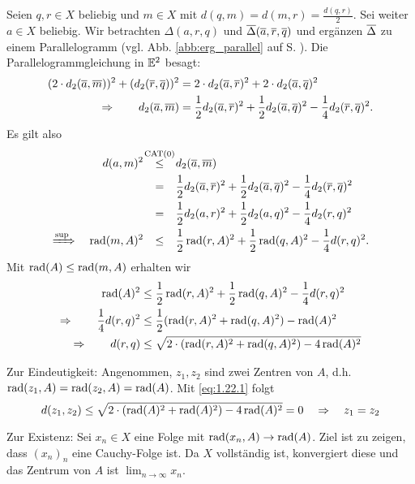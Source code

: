 \begin{beweis}
	Seien $q,r \in X$ beliebig und $m \in X$ mit $d(q,m) = d(m,r) = \frac{d(q,r)}{2}$.
	Sei weiter $a \in X$ beliebig. Wir betrachten $\Delta(a,r,q)$ und $\overline{\Delta}(\overline{a},\overline{r},\overline{q})$ und ergänzen $\overline{\Delta}$ zu einem Parallelogramm (vgl. Abb. \ref{abb:erg_parallel} auf S. \pageref{abb:erg_parallel}). Die Parallelogrammgleichung in $\mathbb{E}^2$ besagt:
	\begin{align*}
		(2 \cdot d_2(\overline{a},\overline{m}))^2 + (d_2(\overline{r},\overline{q}))^2 &= 2 \cdot d_2(\overline{a},\overline{r})^2 + 2 \cdot d_2 (\overline{a},\overline{q})^2 \\
		\Rightarrow \qquad d_2(\overline{a},\overline{m}) &= \frac{1}{2} d_2(\overline{a},\overline{r})^2 + \frac{1}{2} d_2(\overline{a},\overline{q})^2 - \frac{1}{4} d_2 (\overline{r},\overline{q})^2.
	\end{align*}
	\newpage
	Es gilt also
	\begin{align*}
		d(a,m)^2 &\stack{\CAT}{\leq} d_2(\ol{a},\ol{m}) \\
		&\stack{}{=} \frac{1}{2} d_2(\ol{a},\ol{r})^2 + \frac{1}{2} d_2(\ol{a},\ol{q})^2 - \frac{1}{4} d_2 (\ol{r},\ol{q})^2 \\
		&\stack{}{=} \frac{1}{2} d_2(a,r)^2 + \frac{1}{2} d_2(a,q)^2 - \frac{1}{4} d_2 (r,q)^2 \\
		\xRightarrow{\sup} \quad \rad(m,A)^2 &\stack{}{\leq} \frac{1}{2} \rad(r,A)^2 + \frac{1}{2} \rad(q,A)^2 - \frac{1}{4} d(r,q)^2.
	\end{align*}
	Mit $\operatorname{rad}(A) \leq \operatorname{rad}(m,A)$ erhalten wir
	\begin{align}
		\operatorname{rad}(A)^2 &\leq \frac{1}{2} \operatorname{rad}(r,A)^2 + \frac{1}{2} \operatorname{rad}(q,A)^2 - \frac{1}{4} d(r,q)^2 \\
		\Rightarrow \qquad \frac{1}{4} d(r,q)^2 &\leq \frac{1}{2} (\operatorname{rad}(r,A)^2 + \operatorname{rad}(q,A)^2) - \operatorname{rad}(A)^2 \\
		\Rightarrow \qquad d(r,q) &\leq \sqrt{2 \cdot (\operatorname{rad}(r,A)^2 + \operatorname{rad}(q,A)^2) - 4 \operatorname{rad}(A)^2} \label{eq:1.22.1}
	\end{align}
	
	Zur Eindeutigkeit: Angenommen, $z_1,z_2$ sind zwei Zentren von $A$, d.h. $\operatorname{rad}(z_1,A) = \operatorname{rad}(z_2,A) = \operatorname{rad}(A)$. Mit \eqref{eq:1.22.1} folgt
	\[
		d(z_1,z_2) \leq \sqrt{2 \cdot (\operatorname{rad}(A)^2 + \operatorname{rad}(A)^2) - 4\operatorname{rad}(A)^2} = 0 \quad \Rightarrow \quad z_1 = z_2
	\]
	
	Zur Existenz: Sei $x_n \in X$ eine Folge mit $\operatorname{rad}(x_n,A) \rightarrow \operatorname{rad}(A)$. Ziel ist zu zeigen, dass $(x_n)_n$ eine Cauchy-Folge ist.
	Da $X$ vollständig ist, konvergiert diese und das Zentrum von $A$ ist $\lim_{n\rightarrow \infty} x_n$.
	

\end{beweis}
